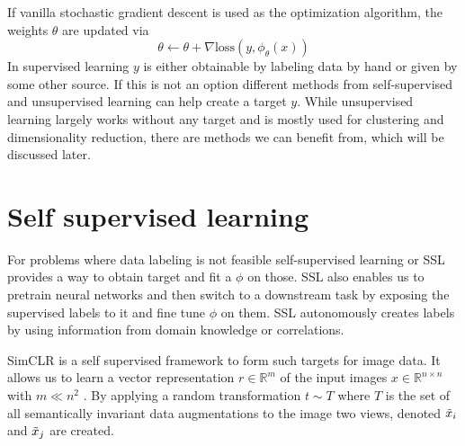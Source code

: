 \documentclass{article}
\begin{document}
\noindent If vanilla stochastic gradient descent is used as the optimization algorithm, the weights $\theta$
are updated via 
\begin{equation}
    \theta \xleftarrow{} \theta + \nabla \mathrm{loss}(y, \phi_\theta(x))
\end{equation}
\noindent In supervised learning $y$ is either obtainable by labeling data by hand or given
by some other source. If this is not an option different methods from
self-supervised and unsupervised learning can help create a target $y$.\newline
While unsupervised learning largely works without any target and is mostly used 
for clustering and dimensionality reduction, there are methods we can benefit from,
which will be discussed later.

\section{Self supervised learning}
For problems where data labeling is not feasible self-supervised learning or SSL
provides a way to obtain target and fit a $\phi$ on those. SSL also enables us
to pretrain neural networks and then switch to a downstream task by exposing the
supervised labels to it and fine tune $\phi$ on them. SSL autonomously creates
labels by using information from domain knowledge or correlations.\newline

\noindent SimCLR is a self supervised framework to form such targets for image data.
It allows us to learn a vector representation $r \in \mathbb{R}^{m}$ of the
input images $x \in \mathbb{R}^{n \times n}$ with $m \ll n^2$ .\newline
By applying a random transformation $t \sim T$ where $T$ is the set of all semantically 
invariant data augmentations to the image two views, denoted $\Tilde{x}_i$ and $\Tilde{x}_j$
are created.
\end{document}
